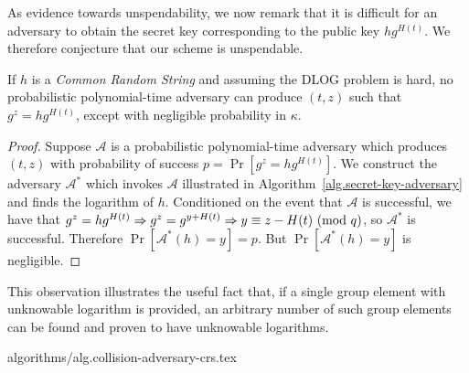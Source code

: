 As evidence towards unspendability, we now remark that it is difficult for an adversary to obtain the secret key corresponding to the public key $h g^{H(t)}$. We therefore conjecture that our scheme is unspendable.

\begin{lemma}
  If $h$ is a \emph{Common Random String} and assuming the DLOG problem is hard, no probabilistic polynomial-time adversary can produce $(t, z)$ such that $g^z = h g^{H(t)}$, except with negligible probability in $\kappa$.
\end{lemma}
\begin{proof}
  Suppose $\mathcal{A}$ is a probabilistic polynomial-time adversary which produces $(t, z)$ with probability of success $p = \Pr[g^z = h g^{H(t)}]$.
  We construct the adversary $\mathcal{A}^*$ which invokes $\mathcal{A}$
  illustrated in Algorithm~\ref{alg.secret-key-adversary} and finds the
  logarithm of $h$.
  Conditioned on the event that $\mathcal{A}$ is successful,
  we have that
  $g^z = h g^{H(t)} \Rightarrow g^z = g^{y + H(t)} \Rightarrow y \equiv z - H(t) \ (\mathrm{mod}\ q)$, so $\mathcal{A}^*$ is successful.
  Therefore $\Pr[\mathcal{A}^*(h) = y] = p$.
  But $\Pr[\mathcal{A}^*(h) = y]$ is negligible.
\end{proof}

This observation illustrates the useful fact that, if a single group element with unknowable logarithm is provided, an arbitrary number of such group elements can be found and proven to have unknowable logarithms.

{algorithms/alg.collision-adversary-crs.tex}

